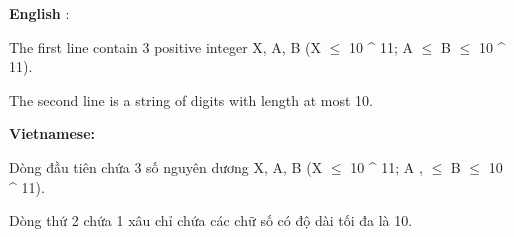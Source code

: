 \textbf{    English   }   :  

   The first line contain 3 positive integer X, A, B (X  $\le$  10 ^ 11; A  $\le$  B  $\le$  10 ^ 11).  

   The second line is a string of digits with length at most 10.  

\textbf{    Vietnamese:   }

   Dòng đầu tiên chứa 3 số nguyên dương X, A, B (X  $\le$  10 ^ 11; A , $\le$  B  $\le$  10 ^ 11).  

   Dòng thứ 2 chứa 1 xâu chỉ chứa các chữ số có độ dài tối đa là 10.  

\